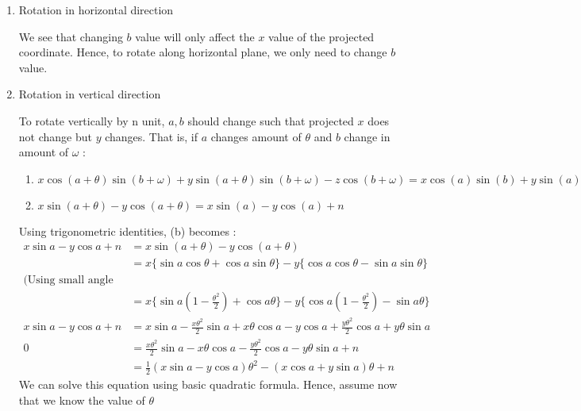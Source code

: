 \documentclass[]{article}
\begin{document}
\begin{enumerate}
\item Rotation in horizontal direction

We see that changing $b$ value will only affect the $x$ value of the projected coordinate. Hence, to rotate along horizontal plane, we only need to change $b$ value.

\item Rotation in vertical direction

To rotate vertically by n unit, $a,b$ should change such that projected $x$ does not change but $y$ changes. That is, if $a$ changes amount of $\theta$ and $b$ change in amount of $\omega$ : 
\begin{enumerate}
\item $x \cos (a + \theta) \sin (b + \omega) + y \sin (a + \theta) \sin (b + \omega) - z \cos (b + \omega) = x \cos (a) \sin (b) + y \sin (a) \sin (b) - z \cos (b)$

\item $x \sin (a + \theta) - y \cos (a + \theta) = x \sin(a) - y\cos (a) + n$
\end{enumerate}


Using trigonometric identities, (b) becomes : 
\begin{equation*}
\begin{split}
x \sin a - y\cos a + n &=x \sin (a + \theta) - y \cos (a + \theta)\\ &= x\{\sin a \cos \theta + \cos a \sin \theta\} - y\{\cos a \cos \theta - \sin a \sin \theta\}\\
\text{(Using small angle approximation)}\\
&=x\{\sin a (1-\frac{\theta^2}{2}) + \cos a  \theta\} - y\{\cos a (1-\frac{\theta^2}{2}) - \sin a \theta\}\\
x \sin a - y\cos a + n &= x\sin a - \frac{x\theta^2}{2}\sin a + x\theta \cos a - y\cos a + \frac{y\theta^2}{2}\cos a + y\theta \sin a\\
0 &= \frac{x\theta^2}{2}\sin a - x\theta \cos a - \frac{y\theta^2}{2}\cos a - y\theta \sin a +n \\
&=\frac{1}{2}(x\sin a - y\cos a)\theta^2 - (x \cos a + y \sin a )\theta +n 
\end{split}
\end{equation*}
We can solve this equation using basic quadratic formula. Hence, assume now that we know the value of $\theta$

\pagebreak


\end{enumerate}
\end{document}
